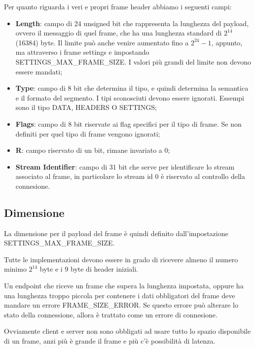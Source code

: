 \documentclass[12pt, a4paper]{article} %
\begin{document}
Per quanto riguarda i veri e propri frame header abbiamo i seguenti campi:
\begin{itemize}
  \item \textbf{Length}: campo di 24 unsigned bit che rappresenta la lunghezza del payload, ovvero il messaggio di quel frame, che ha una lunghezza standard di $2^{14}$ (16384) byte. 
  Il limite può anche venire aumentato fino a $2^{24} - 1$, appunto, ma attraverso i frame settings e impostando SETTINGS\_MAX\_FRAME\_SIZE.
  I valori più grandi del limite non devono essere mandati;

  \item \textbf{Type}: campo di 8 bit che determina il tipo, e quindi determina la semantica e il formato del segmento. I tipi sconosciuti devono essere ignorati.
  Essempi sono il tipo DATA, HEADERS O SETTINGS;
  
  \item \textbf{Flags}: campo di 8 bit riservate ai flag specifici per il tipo di frame. Se non definiti per quel tipo di frame vengono ignorati;
  
  \item \textbf{R}: campo riservato di un bit, rimane invariato a 0; 

  \item \textbf{Stream Identifier}: campo di 31 bit che serve per identificare lo stream associato al frame, in particolare lo stream id 0 è riservato al controllo della connesione.
\end{itemize}

\subsection{Dimensione}
La dimensione per il payload del frame è quindi definito dall'impostazione SETTINGS\_MAX\_FRAME\_SIZE.

Tutte le implementazioni devono essere in grado di ricevere almeno il numero minimo $2^{14}$ byte e i 9 byte di header iniziali.

Un endpoint che riceve un frame che supera la lunghezza impostata, oppure ha una lunghezza troppo piccola per contenere i dati obbligatori del frame deve mandare un errore FRAME\_SIZE\_ERROR.
Se questo errore può alterare lo stato della connessione, allora è trattato come un errore di connesione.

Ovviamente client e server non sono obbligati ad usare tutto lo spazio disponibile di un frame, anzi più è grande il frame e più c'è possibilità di latenza.
\end{document}
